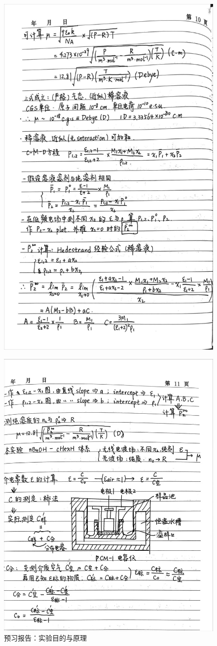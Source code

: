 \documentclass[cn,hazy,pku,12pt,normal,math=newtx,cite=super]{elegantnote}
\begin{document}
\begin{figure}[htbp]
    \centering
    \includegraphics[width=.8\textwidth]{figures/0-1-2.jpg}
\end{figure}

\begin{figure}[htbp]
    \centering
    \includegraphics[width=.8\textwidth]{figures/0-1-3.jpg}
    \caption{预习报告：实验目的与原理}
\end{figure}
\end{document}
